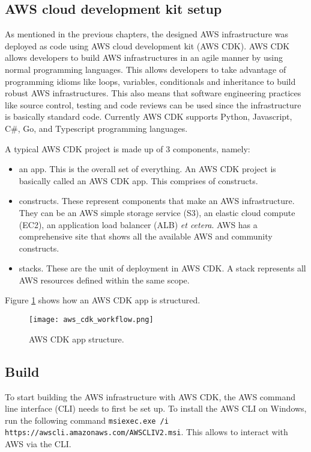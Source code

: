 \subsection{AWS cloud development kit setup}
As mentioned in the previous chapters, the designed AWS infrastructure was deployed as code using AWS cloud development kit (AWS CDK). AWS CDK allows developers to build AWS infrastructures in an agile manner by using normal programming languages. This allows developers to take advantage of programming idioms like loops, variables, conditionals and inheritance to build robust AWS infrastructures. This also means that software engineering practices like source control, testing and code reviews can be used since the infrastructure is basically standard code. Currently AWS CDK supports Python, Javascript, C\#, Go, and Typescript programming languages.

A typical AWS CDK project is made up of 3 components, namely:

\begin{itemize}
    \item an app. This is the overall set of everything. An AWS CDK project is basically called an AWS CDK app. This comprises of constructs.
    \item constructs. These represent components that make an AWS infrastructure. They can be an AWS simple storage service (S3), an elastic cloud compute (EC2), an application load balancer (ALB) \textit{et cetera}. AWS has a comprehensive site that shows all the available AWS and community constructs\cite{awsconstructhub}.
    \item stacks. These are the unit of deployment in AWS CDK. A stack represents all AWS resources defined within the same scope.
\end{itemize}

Figure \ref{fig:aws-cdk-app-structure} shows how an AWS CDK app is structured.

\begin{figure}[H]
    \centering \texttt{[image: aws\_cdk\_workflow.png]}
    \caption{AWS CDK app structure.}
    \label{fig:aws-cdk-app-structure}
\end{figure}

\subsection*{Build}

To start building the AWS infrastructure with AWS CDK, the AWS command line interface (CLI) needs to first be set up. To install the AWS CLI on Windows, run the following command \texttt{msiexec.exe /i https://awscli.amazonaws.com/AWSCLIV2.msi}. This allows to interact with AWS via the CLI.

